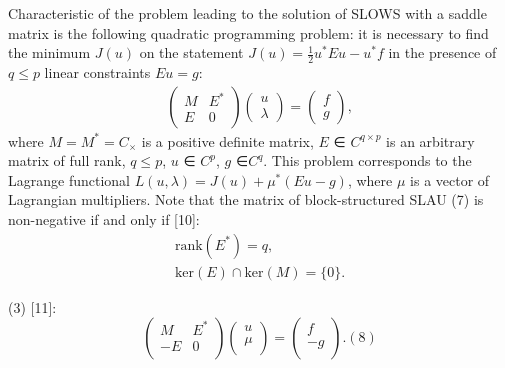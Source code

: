 \documentclass{article}
\begin{document}
Characteristic of the problem leading to the solution of SLOWS with a saddle matrix is the following quadratic programming problem: it is necessary to find the minimum \(J(u)\) on the statement \(J(u)=\frac{1}{2}u^*E u - u^*f\) in the presence of \(q\leq p\) linear constraints \(E u = g\):
\[
\begin{aligned}
\left( \begin{array}{cc}
M & E^* \\
E & 0 
\end{array} \right)
\left( \begin{array}{c}
u \\
\lambda
\end{array} \right)
= 
\left( \begin{array}{c}
f \\
g
\end{array} \right),
\end{aligned}
\]
where \(M = M^*= C_{\times}\) is a positive definite matrix, \(E\) ∈ \(C^{q\times p} \) is an arbitrary matrix of full rank, \(q\leq p\), \(u\) ∈ \(C^p\), \(g\) ∈\(C^q\). This problem corresponds to the Lagrange functional \(L(u, \lambda) = J(u) + \mu^*(E u - g) \), where \(\mu\) is a vector of Lagrangian multipliers. Note that the matrix of block-structured SLAU (7) is non-negative if and only if [10]:
\[
\begin{aligned}
\text{rank}(E^*) = q, \\
\text{ker}(E) \cap \text{ker}(M) = \{0\}.
\end{aligned}
\]

(3)  [11]:
\begin{equation}
\begin{pmatrix}
M & E^* \\
-E & 0 \\
\end{pmatrix}
\begin{pmatrix}
u \\
\mu \\
\end{pmatrix}
=
\begin{pmatrix}
f \\
-g \\
\end{pmatrix}
. (8)
\end{equation}
\end{document}
